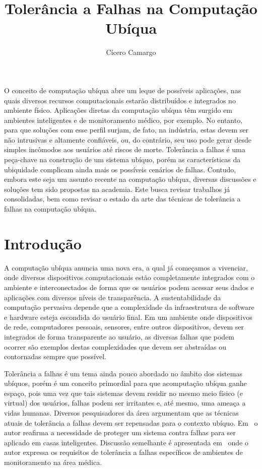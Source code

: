 \documentclass{SBCbookchapter}
\title{Tolerância a Falhas na Computação Ubíqua}
\author{Cícero Camargo}
\begin{document}
\maketitle


\begin{resumo}

O conceito de computação ubíqua abre um leque de possíveis aplicações, nas quais diversos recursos computacionais estarão distribuídos e integrados no ambiente físico. Aplicações diretas da computação ubíqua têm surgido em ambientes inteligentes e de monitoramento médico, por exemplo. No entanto, para que soluções com esse perfil surjam, de fato, na indústria, estas devem ser não intrusivas e altamente confiáveis, ou, do contrário, seu uso pode gerar desde simples incômodos aos usuários até riscos de morte. Tolerância a falhas é uma peça-chave na construção de um sistema ubíquo, porém as características da ubiquidade complicam ainda mais os possíveis cenários de falhas. Contudo, embora este seja um assunto recente na computação ubíqua, diversas discussões e soluções tem sido propostas na academia. Este busca revisar trabalhos já consolidadas, bem como revisar o estado da arte das técnicas de tolerância a falhas na computação ubíqua.

\end{resumo}

\section{Introdução} %

A computação ubíqua anuncia uma nova era, a qual já começamos a vivenciar, onde diversos dispositivos computacionais estão completamente integrados com o ambiente e interconectados de forma que os usuários podem acessar seus dados e aplicações com diversos níveis de transparência. A sustentabilidade da computação pervasiva depende que a complexidade da infraestrutura de software e hardware esteja escondida do usuário final. Em um ambiente onde dispositivos de rede, computadores pessoais, sensores, entre outros dispositivos, devem ser integrados de forma transparente ao usuário, as diversas falhas que podem ocorrer são exemplos destas complexidades que devem ser abstraídas ou contornadas sempre que possível.

Tolerância a falhas é um tema ainda pouco abordado no âmbito dos sistemas ubíquos, porém é um conceito primordial para que acomputação ubíqua ganhe espaço, pois uma vez que tais sistemas devem residir no mesmo meio físico (e virtual) dos usuários, falhas podem ser irritantes e, até mesmo, uma ameaça a vidas humanas. Diversos pesquisadores da área argumentam que as técnicas atuais de tolerância a falhas devem ser repensadas para o contexto ubíquo. Em~\cite{Banavar2000} o autor reafirma a necessidade de proteger um sistema contra falhas para ser aplicado em casas inteligentes. Discussão semelhante é apresentada em~\cite{Bohn02} onde o autor expressa os requisitos de tolerância a falhas específicos de ambientes de monitoramento na área médica.
\end{document}
